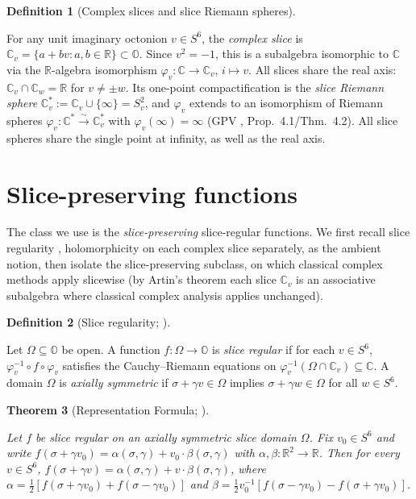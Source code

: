 \documentclass[11pt]{article}
\newcommand{\OO}{\mathbb{O}}
\newcommand{\CC}{\mathbb{C}}
\newcommand{\RR}{\mathbb{R}}
\newcommand{\Cstar}{\CC^{*}}
\providecommand{\lean}[1]{}
\providecommand{\uses}[1]{}
\theoremstyle{plain}
\newtheorem{theorem}{Theorem}[section]
\theoremstyle{definition}
\newtheorem{definition}[theorem]{Definition}
\theoremstyle{remark}
\begin{document}
\begin{definition}[Complex slices and slice Riemann spheres]\label{def:slices}
\lean{Octonion.unitImaginarySphere, Octonion.sliceEmbed,
Octonion.sliceEmbed_mul, Octonion.sliceSphere}
\uses{def:octonions}
For any unit imaginary octonion $v\in S^6$, the \emph{complex slice} is
$\CC_v=\{a+bv:a,b\in\RR\}\subset\OO$. Since $v^2=-1$, this is a subalgebra isomorphic to
$\CC$ via the $\RR$-algebra isomorphism $\varphi_v:\CC\to\CC_v$, $i\mapsto v$. All slices
share the real axis: $\CC_v\cap\CC_w=\RR$ for $v\neq\pm w$. Its one-point compactification
is the \emph{slice Riemann sphere} $\CC_v^{*}:=\CC_v\cup\{\infty\}=S^2_v$, and $\varphi_v$
extends to an isomorphism of Riemann spheres $\varphi_v:\Cstar\xrightarrow{\sim}\CC_v^{*}$
with $\varphi_v(\infty)=\infty$ (GPV \cite{VS}, Prop.~4.1/Thm.~4.2). All slice spheres
share the single point at infinity, as well as the real axis.
\end{definition}

\section{Slice-preserving functions}
The class we use is the \emph{slice-preserving} slice-regular functions. We first recall slice
regularity \cite{GS07,GP11,CSS12,GSS13}, holomorphicity on each complex slice separately, as
the ambient notion, then isolate the slice-preserving subclass, on which classical complex methods
apply slicewise (by Artin's theorem each slice $\CC_v$ is an associative subalgebra where classical
complex analysis applies unchanged).

\begin{definition}[Slice regularity; {\cite[Def.~5.1.1]{CSS12}}]\label{def:slice-regular}
\uses{def:slices}
Let $\Omega\subseteq\OO$ be open. A function $f:\Omega\to\OO$ is \emph{slice regular}
if for each $v\in S^6$, $\varphi_v^{-1}\circ f\circ\varphi_v$ satisfies the
Cauchy--Riemann equations on $\varphi_v^{-1}(\Omega\cap\CC_v)\subseteq\CC$. A domain
$\Omega$ is \emph{axially symmetric} if $\sigma+\gamma v\in\Omega$ implies
$\sigma+\gamma w\in\Omega$ for all $w\in S^6$.
\end{definition}

\begin{theorem}[Representation Formula; {\cite[Thm.~5.1.7]{CSS12}}]\label{thm:rep-formula}
\uses{def:slice-regular}
Let $f$ be slice regular on an axially symmetric slice domain $\Omega$. Fix
$v_0\in S^6$ and write $f(\sigma+\gamma v_0)=\alpha(\sigma,\gamma)+v_0\cdot\beta(\sigma,\gamma)$
with $\alpha,\beta:\RR^2\to\RR$. Then for every $v\in S^6$,
$f(\sigma+\gamma v)=\alpha(\sigma,\gamma)+v\cdot\beta(\sigma,\gamma)$, where
$\alpha=\tfrac12[f(\sigma+\gamma v_0)+f(\sigma-\gamma v_0)]$ and
$\beta=\tfrac12 v_0^{-1}[f(\sigma-\gamma v_0)-f(\sigma+\gamma v_0)]$.
\end{theorem}
\end{document}
